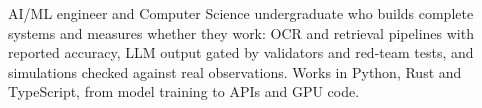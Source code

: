 
AI/ML engineer and Computer Science undergraduate who builds complete systems and measures whether they work: OCR and retrieval pipelines with reported accuracy, LLM output gated by validators and red-team tests, and simulations checked against real observations. Works in Python, Rust and TypeScript, from model training to APIs and GPU code.
